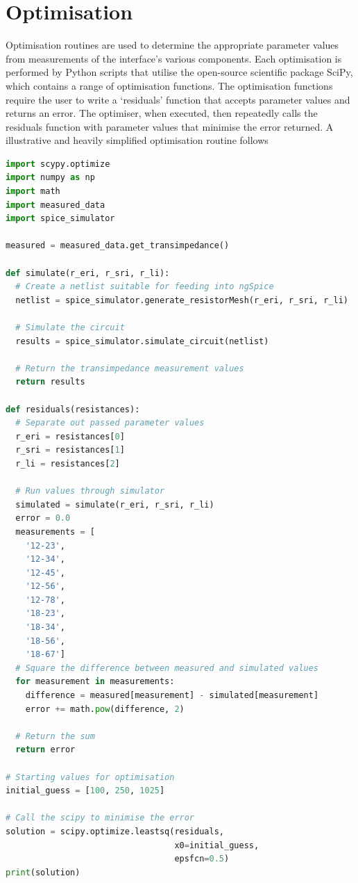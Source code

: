   \section{Optimisation}
  Optimisation routines are used to determine the appropriate parameter values from measurements of the interface's various components.
  Each optimisation is performed by Python scripts that utilise the open-source scientific package SciPy, which contains a range of optimisation functions.
  The optimisation functions require the user to write a `residuals' function that accepts parameter values and returns an error.
  The optimiser, when executed, then repeatedly calls the residuals function with parameter values that minimise the error returned.
  A illustrative and heavily simplified optimisation routine follows
  \begin{lstlisting}[language=Python, basicstyle=\scriptsize]
import scypy.optimize
import numpy as np
import math
import measured_data
import spice_simulator

measured = measured_data.get_transimpedance()

def simulate(r_eri, r_sri, r_li):
  # Create a netlist suitable for feeding into ngSpice
  netlist = spice_simulator.generate_resistorMesh(r_eri, r_sri, r_li)

  # Simulate the circuit
  results = spice_simulator.simulate_circuit(netlist)

  # Return the transimpedance measurement values
  return results

def residuals(resistances):
  # Separate out passed parameter values
  r_eri = resistances[0]
  r_sri = resistances[1]
  r_li = resistances[2]

  # Run values through simulator
  simulated = simulate(r_eri, r_sri, r_li)
  error = 0.0
  measurements = [
    '12-23',
    '12-34',
    '12-45',
    '12-56',
    '12-78',
    '18-23',
    '18-34',
    '18-56',
    '18-67']
  # Square the difference between measured and simulated values
  for measurement in measurements:
    difference = measured[measurement] - simulated[measurement]
    error += math.pow(difference, 2)

  # Return the sum
  return error

# Starting values for optimisation
initial_guess = [100, 250, 1025]

# Call the scipy to minimise the error
solution = scipy.optimize.leastsq(residuals,
                                  x0=initial_guess,
                                  epsfcn=0.5)
print(solution)
\end{lstlisting}

